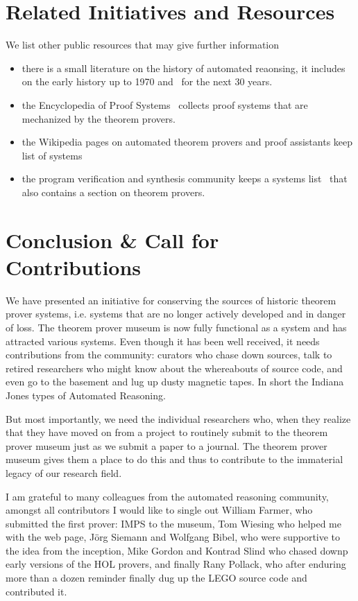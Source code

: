 \documentclass[smallcondensed]{svjour3}
\begin{document}
\section{Related Initiatives and Resources}
We list other public resources that may give further information
\begin{itemize}
\item there is a small literature on the history of automated reaonsing, it
  includes~\cite{Bibel:ehpad07} on the early history up to 1970 and~\cite{RobVor:hoar01}
  for the next 30 years. 
\item the Encyclopedia of Proof Systems~\cite{Wolzenlogel-Paleo:teps17} collects proof
  systems that are mechanized by the theorem provers.
\item the Wikipedia pages on automated theorem provers and proof assistants keep list of systems
\item the program verification and synthesis community keeps a systems
  list~\cite{vsstp:on} that also contains a section on theorem provers.
\end{itemize}

\section{Conclusion \& Call for Contributions}\label{sec:concl}

We have presented an initiative for conserving the sources of historic theorem prover
systems, i.e. systems that are no longer actively developed and in danger of loss. The
theorem prover museum is now fully functional as a system and has attracted various
systems. Even though it has been well received, it needs contributions from the community:
curators who chase down sources, talk to retired researchers who might know about the
whereabouts of source code, and even go to the basement and lug up dusty magnetic
tapes. In short the Indiana Jones types of Automated Reasoning.

But most importantly, we need the individual researchers who, when they realize that they
have moved on from a project to routinely submit to the theorem prover museum just as we
submit a paper to a journal. The theorem prover museum gives them a place to do this and
thus to contribute to the immaterial legacy of our research field. 

\begin{acknowledgements}
  I am grateful to many colleagues from the automated reasoning community, amongst all
  contributors I would like to single out William Farmer, who submitted the first prover:
  IMPS to the museum, Tom Wiesing who helped me with the web page, J\"org Siemann and
  Wolfgang Bibel, who were supportive to the idea from the inception, Mike Gordon and
  Kontrad Slind who chased downp early versions of the HOL provers, and finally Rany
  Pollack, who after enduring more than a dozen reminder finally dug up the LEGO source
  code and contributed it.
\end{acknowledgements}

\printbibliography
\end{document}
